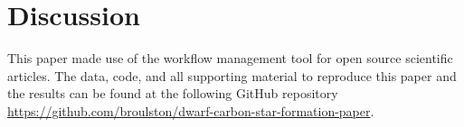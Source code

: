 \documentclass[twocolumn, linenumbers, astrosymb]{aastex631}
\begin{document}

\section{Discussion} \label{discussion}




\begin{acknowledgments} 
This paper made use of the \showyourwork workflow management tool for open source scientific articles. The data, code, and all supporting material to reproduce this paper and the results can be found at the following GitHub repository \url{https://github.com/broulston/dwarf-carbon-star-formation-paper}.
\end{acknowledgments}


{}

\end{document}
